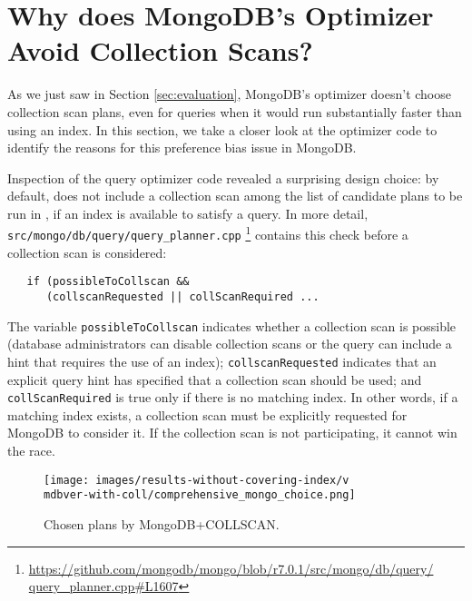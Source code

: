 \section{Why does MongoDB's \approachName Optimizer Avoid Collection Scans?}
\label{sec:rootcauseanalysis}
As we just saw in Section \ref{sec:evaluation}, MongoDB's \approachName optimizer doesn't choose collection scan plans, even for queries when it would run substantially faster than using an index. In this section, we take a closer look at the optimizer code to identify the reasons for this preference bias issue in MongoDB.

Inspection of the query optimizer code revealed a surprising design choice: by default, \relname does not include a collection scan among the list of candidate plans to be run in \approachName, if an index is available to satisfy a query.  In more detail,  \texttt{src/\-mongo/\-db/\-query/\-query\_planner.cpp} \footnote{\href{https://github.com/mongodb/mongo/blob/r7.0.1/src/mongo/db/query/query_planner.cpp\#L1607}{https://github.com/mongodb/mongo/blob/r7.0.1/src/mongo/db/query/ query\_planner.cpp\#L1607}} contains this check before a collection scan is considered:

\begin{verbatim}
   if (possibleToCollscan &&
      (collscanRequested || collScanRequired ...
\end{verbatim}

The variable \texttt{possible\-To\-Collscan} indicates whether a collection scan is possible (database administrators can disable collection scans or the query can include a hint that requires the use of an index); \texttt{collscanRequested} indicates that an explicit query hint has specified that a collection scan should be used; and \texttt{coll\-Scan\-Required} is true only if there is no matching index.  In other words, if a matching index exists, a collection scan must be explicitly requested for MongoDB to consider it.  If the collection scan is not participating, it cannot win the race.

\begin{figure}[htb]
    \centering
    \texttt{[image: images/results-without-covering-index/v\\mdbver-with-coll/comprehensive\_mongo\_choice.png]}
    \caption{Chosen plans by MongoDB+COLLSCAN.}
    \label{fig:mongo-v1-bothindexed-choices}
\end{figure}

